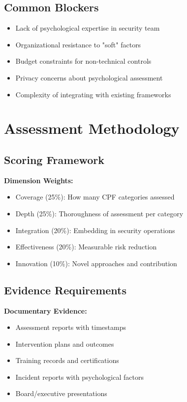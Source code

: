 \documentclass[11pt,a4paper]{article}
\begin{document}
\subsection{Common Blockers}
\begin{itemize}
\item Lack of psychological expertise in security team
\item Organizational resistance to "soft" factors
\item Budget constraints for non-technical controls
\item Privacy concerns about psychological assessment
\item Complexity of integrating with existing frameworks
\end{itemize}

\section{Assessment Methodology}

\subsection{Scoring Framework}

\textbf{Dimension Weights:}
\begin{itemize}
\item Coverage (25\%): How many CPF categories assessed
\item Depth (25\%): Thoroughness of assessment per category
\item Integration (20\%): Embedding in security operations
\item Effectiveness (20\%): Measurable risk reduction
\item Innovation (10\%): Novel approaches and contribution
\end{itemize}

\subsection{Evidence Requirements}

\textbf{Documentary Evidence:}
\begin{itemize}
\item Assessment reports with timestamps
\item Intervention plans and outcomes
\item Training records and certifications
\item Incident reports with psychological factors
\item Board/executive presentations
\end{itemize}
\end{document}
